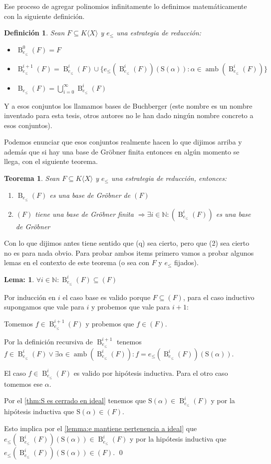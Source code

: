 \documentclass{report}
\theoremstyle{customstyle}
\newtheorem{definition}{Definición}[chapter]
\newtheorem{theorem}{Teorema}[chapter]
\newtheorem{lemma}{Lema:}[chapter]
\renewenvironment{proof}[1][\proofname]{{\bfseries #1: }}{\qed} %
\theoremstyle{factstyle}
\DeclareMathOperator{\amb}{amb}
\renewcommand{\S}{\text{S}}
\DeclareMathOperator{\B}{B}
\begin{document}
Ese proceso de agregar polinomios infinitamente lo definimos matemáticamente con la siguiente definición.

\begin{definition}
  Sean $F ⊆ K⟨X⟩$ y $e_≤$ una estrategia de reducción:
  \begin{itemize}
    \item $\B_{e_≤}^0(F) = F$
    \item $\B_{e_≤}^{i + 1}(F) = \B_{e_≤}^i(F) ∪ \{e_≤(\B_{e_≤}^i(F))(\S(α)) : α ∈ \amb(\B_{e_≤}^i(F))\}$
    \item $\B_{e_≤}(F) = ⋃_{i = 0}^∞ \B_{e_≤}^i(F)$
  \end{itemize}
\end{definition}

Y a esos conjuntos los llamamos bases de Buchberger (este nombre es un nombre inventado para esta tesis, otros autores no le han dado ningún nombre concreto a esos conjuntos).

Podemos enunciar que esos conjuntos realmente hacen lo que dijimos arriba y además que si hay una base de Gröbner finita entonces en algún momento se llega, con el siguiente teorema.

\begin{theorem}\label{thm:Buchberger correctitud}
  Sean $F ⊆ K⟨X⟩$ y $e_≤$ una estrategia de reducción, entonces:
  \begin{enumerate}
    \item $\B_{e_≤}(F)$ es una base de Gröbner de $(F)$
    \item $(F)$ tiene una base de Gröbner finita $⇒ ∃i ∈ ℕ : (\B_{e_≤}^i(F))$ es una base de Gröbner
  \end{enumerate}
\end{theorem}

Con lo que dijimos antes tiene sentido que (q) sea cierto, pero que (2) sea cierto no es para nada obvio. Para probar ambos items primero vamos a probar algunos lemas en el contexto de este teorema (o sea con $F$ y $e_≤$ fijados).

\begin{lemma}\label{lemma:Buchberger correctitud:3}
  $∀i ∈ ℕ : \B_{e_≤}^{i}(F) ⊆ (F)$
\end{lemma}
\begin{proof}
  Por inducción en $i$ el caso base es valido porque $F ⊆ (F)$, para el caso inductivo supongamos que vale para $i$ y probemos que vale para $i + 1$:

  Tomemos $f ∈ \B_{e_≤}^{i + 1}(F)$ y probemos que $f ∈ (F)$.

  Por la definición recursiva de $\B_{e_≤}^{i + 1}$ tenemos $f ∈ \B_{e_≤}^i(F) ∨ ∃α ∈ \amb(\B_{e_≤}^i(F)) : f = e_≤(\B_{e_≤}^i(F))(\S(α))$.

  El caso $f ∈ \B_{e_≤}^i(F)$ es valido por hipótesis inductiva. Para el otro caso tomemos ese $α$.

  Por el \cref{thm:S es cerrado en ideal} tenemos que $\S(α) ∈ \B_{e_≤}^i(F)$ y por la hipótesis inductiva que $\S(α) ∈ (F)$.

  Esto implica por el \cref{lemma:e mantiene pertenencia a ideal} que $e_≤(\B_{e_≤}^i(F))(\S(α)) ∈ \B_{e_≤}^i(F)$ y por la hipótesis inductiva que $e_≤(\B_{e_≤}^i(F))(\S(α)) ∈ (F)$.
\end{proof}
\end{document}
